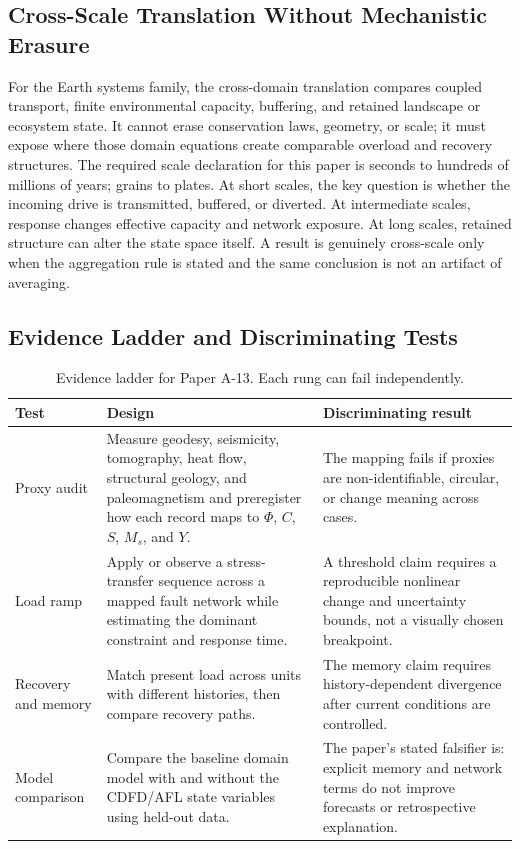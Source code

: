 \documentclass[11pt,a4paper]{article}
\begin{document}
\subsection{Cross-Scale Translation Without Mechanistic Erasure}

For the Earth systems family, the cross-domain translation compares coupled transport, finite environmental capacity, buffering, and retained landscape or ecosystem state. It cannot erase conservation laws, geometry, or scale; it must expose where those domain equations create comparable overload and recovery structures. \cite{Holling1973,Turing1952,BakTangWiesenfeld1987}
The required scale declaration for this paper is seconds to hundreds of millions of years; grains to plates. At short
scales, the key question is whether the incoming drive is transmitted,
buffered, or diverted. At intermediate scales, response changes effective
capacity and network exposure. At long scales, retained structure can alter the
state space itself. A result is genuinely cross-scale only when the aggregation
rule is stated and the same conclusion is not an artifact of averaging.

\subsection{Evidence Ladder and Discriminating Tests}

\begin{table}[htbp]
\centering
\small
\caption{Evidence ladder for Paper A-13. Each rung can fail independently.}
\begin{tabularx}{\textwidth}{|p{}|X|X|}
\hline
\textbf{Test} & \textbf{Design} & \textbf{Discriminating result} \\
\hline
Proxy audit & Measure geodesy, seismicity, tomography, heat flow, structural geology, and paleomagnetism and preregister how each record maps to $\Phi$, $C$, $S$, $M_s$, and $Y$. & The mapping fails if proxies are non-identifiable, circular, or change meaning across cases. \\
\hline
Load ramp & Apply or observe a stress-transfer sequence across a mapped fault network while estimating the dominant constraint and response time. & A threshold claim requires a reproducible nonlinear change and uncertainty bounds, not a visually chosen breakpoint. \\
\hline
Recovery and memory & Match present load across units with different histories, then compare recovery paths. & The memory claim requires history-dependent divergence after current conditions are controlled. \\
\hline
Model comparison & Compare the baseline domain model with and without the CDFD/AFL state variables using held-out data. & The paper's stated falsifier is: explicit memory and network terms do not improve forecasts or retrospective explanation. \\
\hline
\end{tabularx}
\end{table}
\end{document}
